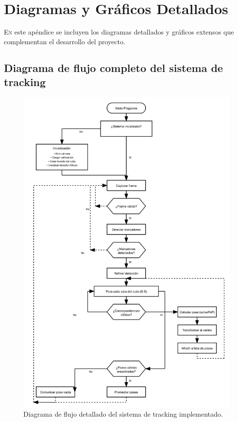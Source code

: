 \chapter{Diagramas y Gráficos Detallados}
\label{chap:diagramas_detallados}

\lettrine{E}{n} este apéndice se incluyen los diagramas detallados y gráficos extensos que complementan el desarrollo del proyecto.




\section{Diagrama de flujo completo del sistema de tracking}

\begin{figure}[h!]
	\centering
	\includegraphics[width=1.0\textwidth]{imaxes/flujo_tfg_correcto.png}
	\caption{Diagrama de flujo detallado del sistema de tracking implementado.}
	\label{fig:flujo_tfg_detallado}
\end{figure}




